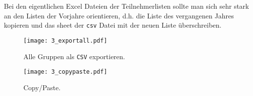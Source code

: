 
Bei den eigentlichen Excel Dateien der Teilnehmerlisten sollte man sich sehr
stark an den Listen der Vorjahre orientieren, d.h. die Liste des vergangenen
Jahres kopieren und das sheet der {\tt csv} Datei mit der neuen Liste
überschreiben.

\begin{figure}[htbp]
\begin{center}
  \texttt{[image: 3\_exportall.pdf]}
  \caption{ Alle Gruppen als {\tt CSV} exportieren.}
  \label{fig:exportall}
\end{center}
\end{figure}

\begin{figure}[htbp]
\begin{center}
  \texttt{[image: 3\_copypaste.pdf]}
  \caption{ Copy/Paste.}
  \label{fig:copypaste}
\end{center}
\end{figure}

